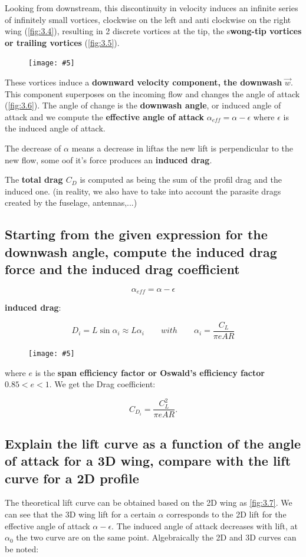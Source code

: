 \documentclass[british,french,11pt, a4paper, openany]{article}
\newcommand{\wrapfig}[6]{%
	\begin{figure}%
		\vspace{-5mm}%
		\texttt{[image: \#5]}%
		\captionof{figure}{}%
		\label{#6}%
	\end{figure}%
}
\begin{document}
Looking from downstream, this discontinuity in velocity induces an infinite series of infinitely small vortices, clockwise on the left and anti clockwise on the right wing (\autoref{fig:3.4}), resulting in 2 discrete vortices at the tip, the s\textbf{wong-tip vortices or trailing vortices} (\autoref{fig:3.5}). 

\wrapfig{7}{l}{6.5}{0.08}{ch3/6}{fig:3.6}
These vortices induce a \textbf{downward velocity component, the downwash} $\vec{w}$. This component superposes on the incoming flow and changes the angle of attack (\autoref{fig:3.6}). The angle of change is the \textbf{downwash angle}, or induced angle of attack and we compute the \textbf{effective angle of attack} $\alpha _{eff} = \alpha - \epsilon$ where $\epsilon$ is the induced angle of attack.

The decrease of $\alpha$ means a decrease in liftas the new lift is perpendicular to the new flow, some oof it's force produces an \textbf{induced drag}.

The \textbf{total drag $C_D$} is computed as being the sum of the profil drag and the induced one. (in reality, we also have to take into account the parasite drags created by the fuselage, antennas,...)

\subsection{Starting from the given expression for the downwash angle, compute the induced drag force and the induced drag coefficient}

\begin{equation}
\alpha _{eff} = \alpha - \epsilon
\end{equation}

\textbf{induced drag}: 

\begin{equation}
D_i = L \sin \alpha _i \approx L\alpha _i \qquad with \qquad \alpha _i = \frac{C_L}{\pi e AR} 
\label{eq:3.2}
\end{equation}

\wrapfig{10}{r}{5.5}{0.1}{ch3/7}{fig:3.7}
where $e$ is the \textbf{span efficiency factor or Oswald's efficiency factor} $0.85<e<1$. We get the Drag coefficient:

\begin{equation}
C_{D_i} =  \frac{C_L^2}{\pi e AR} .
\end{equation}

\subsection{Explain the lift curve as a function of the angle of attack for a 3D wing, compare with the lift curve for a 2D profile}
The theoretical lift curve can be obtained based on the 2D wing as \autoref{fig:3.7}. We can see that the 3D wing lift for a certain $\alpha$ corresponds to the 2D lift for the effective angle of attack $\alpha - \epsilon$. The induced angle of attack decreases with lift, at $\alpha _0$ the two curve are on the same point. Algebraically the 2D and 3D curves can be noted:
\end{document}
